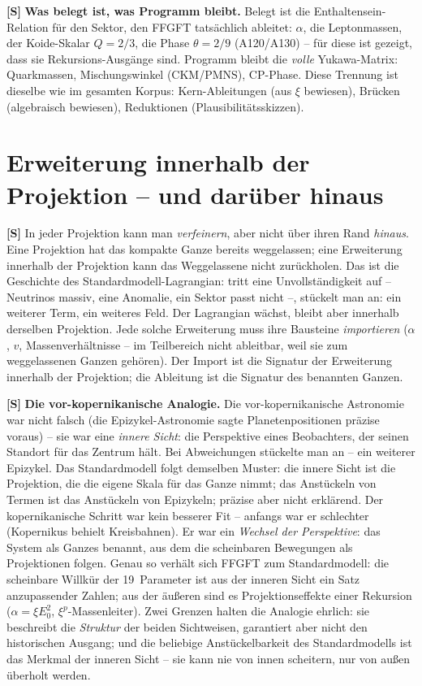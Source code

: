 \textbf{[S]} \textbf{Was belegt ist, was Programm bleibt.} Belegt ist die
Enthaltensein-Relation für den Sektor, den FFGFT tatsächlich ableitet: $\alpha$,
die Leptonmassen, der Koide-Skalar $Q=2/3$, die Phase $\theta=2/9$ (A120/A130) --
für diese ist gezeigt, dass sie Rekursions-Ausgänge sind. Programm bleibt die
\emph{volle} Yukawa-Matrix: Quarkmassen, Mischungswinkel (CKM/PMNS), CP-Phase.
Diese Trennung ist dieselbe wie im gesamten Korpus: Kern-Ableitungen (aus $\xi$
bewiesen), Brücken (algebraisch bewiesen), Reduktionen (Plausibilitätsskizzen).

\section{Erweiterung innerhalb der Projektion -- und darüber hinaus}

\textbf{[S]} In jeder Projektion kann man \emph{verfeinern}, aber nicht über
ihren Rand \emph{hinaus}. Eine Projektion hat das kompakte Ganze bereits
weggelassen; eine Erweiterung innerhalb der Projektion kann das Weggelassene
nicht zurückholen. Das ist die Geschichte des Standardmodell-Lagrangian: tritt
eine Unvollständigkeit auf -- Neutrinos massiv, eine Anomalie, ein Sektor passt
nicht --, stückelt man an: ein weiterer Term, ein weiteres Feld. Der Lagrangian
wächst, bleibt aber innerhalb derselben Projektion. Jede solche Erweiterung muss
ihre Bausteine \emph{importieren} ($\alpha$, $v$, Massenverhältnisse -- im
Teilbereich nicht ableitbar, weil sie zum weggelassenen Ganzen gehören). Der
Import ist die Signatur der Erweiterung innerhalb der Projektion; die Ableitung
ist die Signatur des benannten Ganzen.

\textbf{[S]} \textbf{Die vor-kopernikanische Analogie.} Die
vor-kopernikanische Astronomie war nicht falsch (die Epizykel-Astronomie sagte
Planetenpositionen präzise voraus) -- sie war eine \emph{innere Sicht}: die
Perspektive eines Beobachters, der seinen Standort für das Zentrum hält. Bei
Abweichungen stückelte man an -- ein weiterer Epizykel. Das Standardmodell folgt
demselben Muster: die innere Sicht ist die Projektion, die die eigene Skala für
das Ganze nimmt; das Anstückeln von Termen ist das Anstückeln von Epizykeln;
präzise aber nicht erklärend. Der kopernikanische Schritt war kein besserer Fit
-- anfangs war er schlechter (Kopernikus behielt Kreisbahnen). Er war ein
\emph{Wechsel der Perspektive}: das System als Ganzes benannt, aus dem die
scheinbaren Bewegungen als Projektionen folgen. Genau so verhält sich FFGFT zum
Standardmodell: die scheinbare Willkür der 19~Parameter ist aus der inneren Sicht
ein Satz anzupassender Zahlen; aus der äußeren sind es Projektionseffekte einer
Rekursion ($\alpha=\xi E_0^2$, $\xi^p$-Massenleiter). Zwei Grenzen halten die
Analogie ehrlich: sie beschreibt die \emph{Struktur} der beiden Sichtweisen,
garantiert aber nicht den historischen Ausgang; und die beliebige
Anstückelbarkeit des Standardmodells ist das Merkmal der inneren Sicht -- sie kann
nie von innen scheitern, nur von außen überholt werden.

